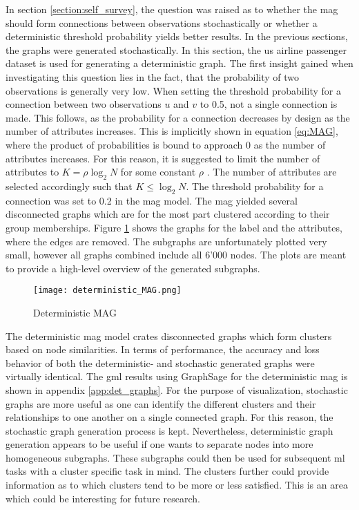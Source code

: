   In section \ref{section:self_survey}, the question was raised 
  as to whether the \acs{mag} should form connections between observations
  stochastically or whether a deterministic threshold probability yields better 
  results. In the previous sections, the graphs were generated stochastically.
  In this section, the \acs{us} airline passenger dataset is used for 
  generating a deterministic graph. The first insight gained when investigating 
  this question lies in the fact, that the probability of two observations is 
  generally very low. When setting the threshold probability for a connection 
  between two observations $u$ and $v$ to 0.5, not a single connection is made. 
  This follows, as the probability for a connection decreases by design as the 
  number of attributes increases. This is implicitly shown in equation 
  \ref{eq:MAG}, where the product of probabilities is bound to approach 0 as
  the number of attributes increases. For this reason, it is suggested to limit 
  the number of attributes to $K=\rho\log_{2}N$ for some constant $\rho$ 
  \citep[p. 122]{kim2012multiplicative}. The number of attributes are selected 
  accordingly such that $K\leqslant\log_{2} N$. The threshold probability for a 
  connection was set to 0.2 in the \acs{mag} model. The \acs{mag} yielded 
  several disconnected graphs which are for the most part clustered according to 
  their group memberships. Figure \ref{fig:det_MAG} shows the graphs for the 
  label and the attributes, where the edges are removed. The subgraphs are 
  unfortunately plotted very small, however all graphs combined include all 
  6'000 nodes. The plots are meant to provide a high-level overview of the 
  generated subgraphs. 

  \begin{figure}[h]
		\centering
		\texttt{[image: deterministic\_MAG.png]}
		\caption{Deterministic MAG}
        \label{fig:det_MAG}
  \end{figure}

  \noindent The deterministic \acs{mag} model crates disconnected graphs which 
  form clusters based on node similarities. In terms of performance, the accuracy 
  and loss behavior of both the deterministic- and stochastic generated graphs 
  were virtually identical. The \acs{gml} results using GraphSage for the
  deterministic \acs{mag} is shown in appendix \ref{app:det_graphs}. For the 
  purpose of visualization, stochastic graphs are more useful as one can 
  identify the different clusters and their relationships to one another on a 
  single connected graph. For this reason, the stochastic graph generation 
  process is kept. Nevertheless, deterministic graph generation appears to be 
  useful if one wants to separate nodes into more homogeneous subgraphs. These 
  subgraphs could then be used for subsequent \acs{ml} tasks with a cluster 
  specific task in mind. The clusters further could provide information as to 
  which clusters tend to be more or less satisfied. This is an area which could 
  be interesting for future research.
  
